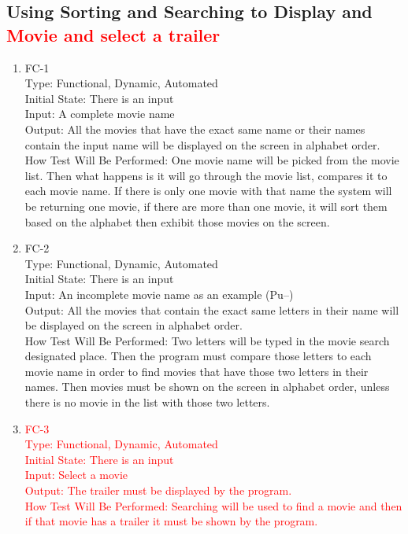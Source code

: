 \documentclass[12pt, titlepage]{article}
\begin{document}
\subsection{Using Sorting and Searching to Display and \textcolor{red}{Movie and select a trailer}}
		

\begin{enumerate}

\item{FC-1\\}
Type:  Functional, Dynamic, Automated\\
Initial State: There is an input\\
Input: A complete movie name \\
Output: All the movies that have the exact same name or their names contain the input name will be displayed on the screen in alphabet order.\\
How Test Will Be Performed: One movie name will be picked from the movie list. Then what happens is it will go through the movie list, compares it to each movie name. If there is only one movie with that name the system will be returning one movie, if there are more than one movie, it will sort them based on the alphabet then exhibit those movies on the screen.

					
\item{FC-2\\}
Type:  Functional, Dynamic, Automated\\
Initial State: There is an input\\
Input: An incomplete movie name as an example (Pu--)\\
Output: All the movies that contain the exact same letters in their name will be displayed on the screen in alphabet order.\\
How Test Will Be Performed: Two letters will be typed in the movie search designated place. Then the program must compare those letters to each movie name in order to find movies that have those two letters in their names. Then movies must be shown on the screen in alphabet order, unless there is no movie in the list with those two letters. 

\item{\textcolor{red}{FC-3\\}}
\textcolor{red}{Type:  Functional, Dynamic, Automated\\}
\textcolor{red}{Initial State: There is an input\\}
\textcolor{red}{Input: Select a movie\\}
\textcolor{red}{Output: The trailer must be displayed by the program.\\}
\textcolor{red}{How Test Will Be Performed: Searching will be used to find a movie and then if that movie has a trailer it must be shown by the program. }

\end{enumerate}
\end{document}
